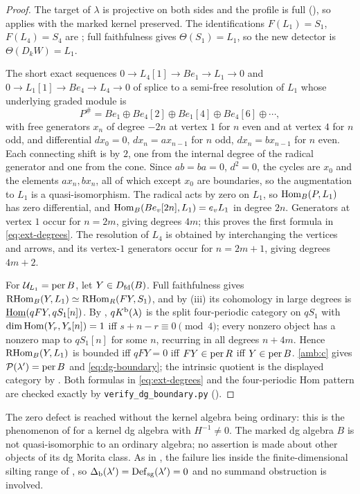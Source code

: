 \begin{proof}
The target of \(\lambda\) is projective on both sides and the profile is full (), so  applies with the marked kernel preserved.  The identifications \(F(L_1)=S_1\), \(F(L_4)=S_4\) are ; full faithfulness gives \(\Theta(S_1)=L_1\), so the new detector is \(\Theta(D_kW)=L_1\).

The short exact sequences \(0\to L_4[1]\to Be_1\to L_1\to0\) and \(0\to L_1[1]\to Be_4\to L_4\to0\) of  splice to a semi-free resolution of \(L_1\) whose underlying graded module is
\[
 P^{\#}=Be_1\oplus Be_4[2]\oplus Be_1[4]\oplus Be_4[6]\oplus\cdots,
\]
with free generators \(x_n\) of degree \(-2n\) at vertex \(1\) for \(n\) even and at vertex \(4\) for \(n\) odd, and differential \(dx_0=0\), \(dx_n=ax_{n-1}\) for \(n\) odd, \(dx_n=bx_{n-1}\) for \(n\) even.  Each connecting shift is by \(2\), one from the internal degree of the radical generator and one from the cone.  Since \(ab=ba=0\), \(d^2=0\), the cycles are \(x_0\) and the elements \(ax_n,bx_n\), all of which except \(x_0\) are boundaries, so the augmentation to \(L_1\) is a quasi-isomorphism.  The radical acts by zero on \(L_1\), so \(\operatorname{Hom}_B(P,L_1)\) has zero differential, and \(\operatorname{Hom}_B(Be_v[2n],L_1)=e_vL_1\) in degree \(2n\).  Generators at vertex \(1\) occur for \(n=2m\), giving degrees \(4m\); this proves the first formula in \eqref{eq:ext-degrees}.  The resolution of \(L_4\) is obtained by interchanging the vertices and arrows, and its vertex-\(1\) generators occur for \(n=2m+1\), giving degrees \(4m+2\).

For \(\mathcal U_{L_1}=\operatorname{per} B\), let \(Y\in D_{\mathrm{fd}}(B)\).  Full faithfulness gives \(\operatorname{RHom}_B(Y,L_1)\simeq\operatorname{RHom}_R(FY,S_1)\), and by (iii) its cohomology in large degrees is \(\underline{\operatorname{Hom}}(qFY,qS_1[n])\).  By , \(qK^{\mathrm b}(\lambda)\) is the split four-periodic category on \(qS_1\) with \(\dim\operatorname{Hom}(Y_r,Y_s[n])=1\) iff \(s+n-r\equiv0\pmod4\); every nonzero object has a nonzero map to \(qS_1[n]\) for some \(n\), recurring in all degrees \(n+4m\).  Hence \(\operatorname{RHom}_B(Y,L_1)\) is bounded iff \(qFY=0\) iff \(FY\in\operatorname{per} R\) iff \(Y\in\operatorname{per} B\).  \ref{amb:c} gives \(\mathcal P(\lambda')=\operatorname{per} B\) and \eqref{eq:dg-boundary}; the intrinsic quotient is the displayed category by .  Both formulas in \eqref{eq:ext-degrees} and the four-periodic Hom pattern are checked exactly by \texttt{verify\_dg\_boundary.py} ().
\end{proof}

\begin{remark}
The zero defect is reached without the kernel algebra being ordinary: this is the phenomenon of  for a kernel dg algebra with \(H^{-1}\ne0\).  The marked dg algebra \(B\) is not quasi-isomorphic to an ordinary algebra; no assertion is made about other objects of its dg Morita class.  As in , the failure lies inside the finite-dimensional silting range of , so \(\Delta_{\mathrm b}(\lambda')=\operatorname{Def}_{\mathrm{sg}}(\lambda')=0\) and no summand obstruction is involved.
\end{remark}
